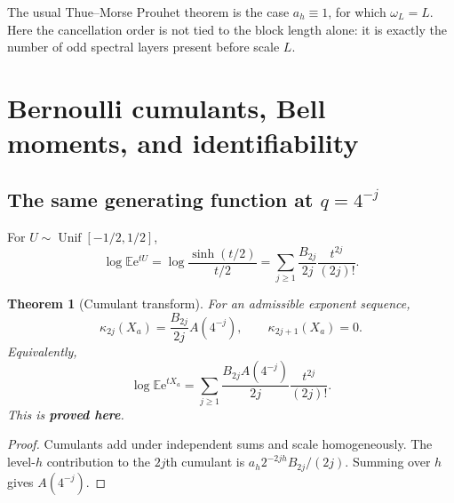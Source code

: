 \documentclass[11pt,oneside]{article}
\numberwithin{equation}{section}
\newtheorem{theorem}{Theorem}[section]
\theoremstyle{definition}
\theoremstyle{remark}
\newcommand{\E}{\mathbb E}
\newcommand{\e}{\mathrm e}
\newcommand{\statusproved}{\textcolor{deepgreen}{\textbf{proved here}}}
\begin{document}
\begin{remark}
The usual Thue--Morse Prouhet theorem is the case $a_h\equiv1$, for which
$\omega_L=L$.  Here the cancellation order is not tied to the block length alone: it is
exactly the number of odd spectral layers present before scale $L$.
\end{remark}

\section{Bernoulli cumulants, Bell moments, and identifiability}
\label{p1:sec:cumulants}

\subsection{The same generating function at $q=4^{-j}$}

For $U\sim\operatorname{Unif}[-1/2,1/2]$,
\begin{equation}
 \log\E\e^{tU}
 =\log\frac{\sinh(t/2)}{t/2}
 =\sum_{j\ge1}\frac{B_{2j}}{2j}\frac{t^{2j}}{(2j)!}.
 \label{p1:eq:uniform-cumulants}
\end{equation}

\begin{theorem}[Cumulant transform]
\label{p1:thm:cumulants}
For an admissible exponent sequence,
\begin{equation}
 \boxed{\quad
 \kappa_{2j}(X_a)=\frac{B_{2j}}{2j}A(4^{-j}),
 \qquad
 \kappa_{2j+1}(X_a)=0.
 \quad}
 \label{p1:eq:kappa-a}
\end{equation}
Equivalently,
\begin{equation}
 \log\E\e^{tX_a}
 =\sum_{j\ge1}\frac{B_{2j}A(4^{-j})}{2j}\frac{t^{2j}}{(2j)!}.
 \label{p1:eq:mgf-a}
\end{equation}
This is \statusproved.
\end{theorem}

\begin{proof}
Cumulants add under independent sums and scale homogeneously.  The level-$h$ contribution to
the $2j$th cumulant is $a_h2^{-2jh}B_{2j}/(2j)$.  Summing over $h$ gives
$A(4^{-j})$.
\end{proof}
\end{document}

